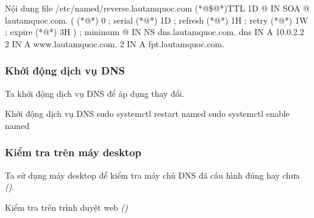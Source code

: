 
\begin{coding}{Nội dung file /etc/named/reverse.lautamquoc.com}
  (*@\$@*)TTL 1D
  @       IN SOA      @       lautamquoc.com. (
  (*@\qquad@*)                                0       ; serial
  (*@\qquad@*)                                1D      ; refresh
  (*@\qquad@*)                                1H      ; retry
  (*@\qquad@*)                                1W      ; expire
  (*@\qquad@*)                                3H )    ; minimum
  @       IN NS       dns.lautamquoc.com.
  dns     IN A        10.0.2.2
  2       IN A        www.lautamquoc.com.
  2       IN A        fpt.lautamquoc.com.
\end{coding}


\subsubsection{Khởi động dịch vụ DNS}

Ta khởi động dịch vụ DNS để áp dụng thay đổi.

\begin{coding}{Khởi động dịch vụ DNS}
  sudo systemctl restart named
  sudo systemctl enable named
\end{coding}


\subsubsection{Kiểm tra trên máy desktop}

Ta sử dụng máy desktop để kiểm tra máy chủ DNS đã cấu hình đúng hay chưa \textit{()}.



Kiểm tra trên trình duyệt web \textit{()}


